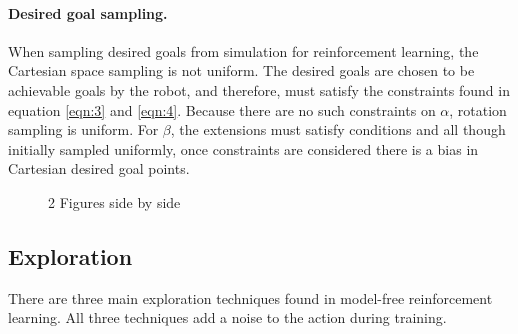 \paragraph{Desired goal sampling.} When sampling desired goals from simulation for reinforcement learning, the Cartesian space sampling is not uniform. The desired goals are chosen to be achievable goals by the robot, and therefore, must satisfy the constraints found in equation \ref{eqn:3} and \ref{eqn:4}. Because there are no such constraints on $\alpha$, rotation sampling is uniform. For $\beta$, the extensions must satisfy conditions and all though initially sampled uniformly, once constraints are considered there is a bias in Cartesian desired goal points.
\begin{figure}%
    \centering
    \qquad
    \caption{2 Figures side by side}%
    \label{fig:example}%
\end{figure}

\subsection{Exploration}
There are three main exploration techniques found in model-free reinforcement learning. All three techniques add a noise to the action during training.

